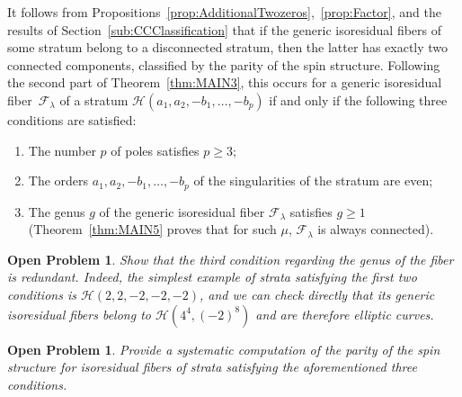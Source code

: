 \documentclass[11pt]{article}
\newtheorem{opprob}[thm]{Open Problem}
\theoremstyle{definition}
\begin{document}
It follows from Propositions~\ref{prop:AdditionalTwozeros},~\ref{prop:Factor}, and the results of Section~\ref{sub:CCClassification} that if the generic isoresidual fibers of some stratum belong to a disconnected stratum, then the latter has exactly two connected components, classified by the parity of the spin structure. Following the second part of Theorem~\ref{thm:MAIN3}, this occurs for a generic isoresidual fiber~$\mathcal{F}_{\lambda}$ of a stratum $\mathcal{H}(a_{1},a_{2},-b_{1},\dots,-b_{p})$ if and only if the following three conditions are satisfied:
\begin{enumerate}
\item The number $p$ of poles satisfies $p \geq 3$;
\item The orders $a_{1},a_{2},-b_{1},\dots,-b_{p}$ of the singularities of the stratum are even;
\item The genus $g$ of the generic isoresidual fiber $\mathcal{F}_{\lambda}$ satisfies $g \geq 1$ (Theorem~\ref{thm:MAIN5} proves that for such $\mu$, $\mathcal{F}_{\lambda}$ is always connected).
\end{enumerate}

\begin{opprob}
Show that the third condition regarding the genus of the fiber is redundant. Indeed, the simplest example of strata satisfying the first two conditions is $\mathcal{H}(2,2,-2,-2,-2)$, and we can check directly that its generic isoresidual fibers belong to $\mathcal{H}(4^{4},(-2)^{8})$ and are therefore elliptic curves.
\end{opprob}

\begin{opprob}
Provide a systematic computation of the parity of the spin structure for isoresidual fibers of strata satisfying the aforementioned three conditions.
\end{opprob}

\end{document}
